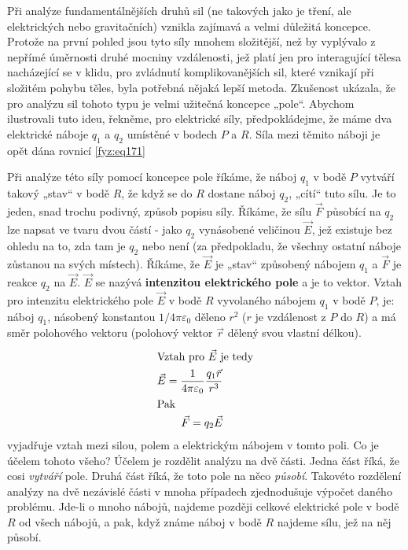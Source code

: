     Při analýze fundamentálnějších druhů sil (ne takových jako je tření, ale elektrických nebo 
    gravitačních) vznikla zajímavá a velmi důležitá koncepce. Protože na první pohled jsou tyto 
    síly mnohem složitější, než by vyplývalo z nepřímé úměrnosti druhé mocniny vzdálenosti, jež 
    platí jen pro interagující tělesa nacházející se v klidu, pro zvládnutí komplikovanějších sil, 
    které vznikají při složitém pohybu těles, byla potřebná nějaká lepší metoda. Zkušenost ukázala, 
    že pro analýzu sil tohoto typu je velmi užitečná koncepce „pole“. Abychom ilustrovali tuto 
    ideu, řekněme, pro elektrické síly, předpokládejme, že máme dva elektrické náboje \(q_1\) a 
    \(q_2\) umístěné v bodech \(P\) a \(R\). Síla mezi těmito náboji je opět dána rovnicí 
    \ref{fyz:eq171}
    
    Při analýze této síly pomocí koncepce pole říkáme, že náboj \(q_1\) v bodě \(P\) vytváří takový 
    „stav“ v bodě \(R\), že když se do \(R\) dostane náboj \(q_2\), „cítí“ tuto sílu. Je to jeden, 
    snad trochu podivný, způsob popisu síly. Říkáme, že sílu \(\vec{F}\) působící na \(q_2\) lze 
    napsat ve tvaru dvou částí - jako \(q_2\) vynásobené veličinou \(\vec{E}\), jež existuje bez 
    ohledu na to, zda tam je \(q_2\) nebo není (za předpokladu, že všechny ostatní náboje zůstanou 
    na svých místech). Říkáme, že  \(\vec{E}\) je „stav“ způsobený nábojem \(q_1\) a \(\vec{F}\) je 
    reakce \(q_2\) na \(\vec{E}\). \(\vec{E}\) se nazývá \textbf{intenzitou elektrického pole} a je 
    to vektor. Vztah pro intenzitu elektrického pole \(\vec{E}\) v bodě \(R\) vyvolaného nábojem 
    \(q_1\) v bodě \(P\), je: náboj \(q_1\), násobený konstantou \(1/4\pi\varepsilon_0\) děleno 
    \(r^2\) (\(r\) je vzdálenost z \(P\) do \(R\)) a má směr polohového vektoru (polohový vektor 
    \(\vec{r}\) dělený svou vlastní délkou).
    \begin{align}
      \shortintertext{Vztah pro \(\vec{E}\) je tedy}
      \vec{E} = \frac{1}{4\pi\varepsilon_0}\frac{q_1\vec{r}}{r^3}   \label{fyz:eq172} \\
      \shortintertext{Pak}
      \vec{F} = q_2\vec{E}                                          \label{fyz:eq173}
    \end{align}
    vyjadřuje vztah mezi silou, polem a elektrickým nábojem v tomto poli. Co je účelem tohoto 
    všeho? Účelem je rozdělit analýzu na dvě části. Jedna část říká, že cosi \emph{vytváří} pole. 
    Druhá část říká, že toto pole na něco \emph{působí}. Takovéto rozdělení analýzy na dvě 
    nezávislé části v mnoha případech zjednodušuje výpočet daného problému. Jde-li o mnoho nábojů, 
    najdeme později celkové elektrické pole v bodě \(R\) od všech nábojů, a pak, když známe náboj v 
    bodě \(R\) najdeme sílu, jež na něj působí.
    
